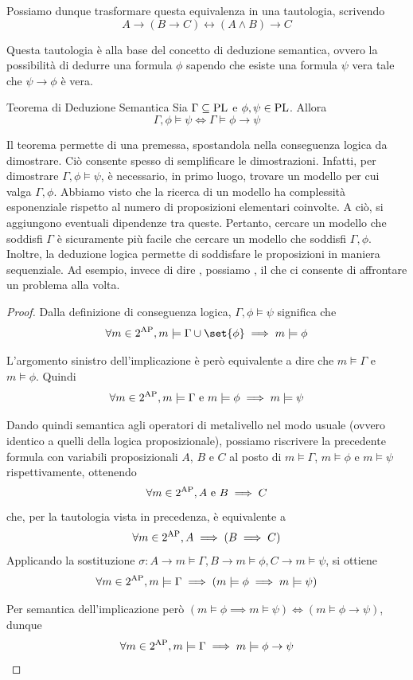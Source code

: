 Possiamo dunque trasformare questa equivalenza in una tautologia, scrivendo
\[A \to (B\to C) \leftrightarrow (A\land B)\to C\]

Questa tautologia è alla base del concetto di deduzione semantica, ovvero la possibilità di dedurre una formula \(\phi\) sapendo che esiste una formula \(\psi\) vera tale che \(\psi \to \phi\) è vera.

\begin{theorem}[namedlabel={thm:semantic_deduction}{Teorema di Deduzione Semantica}]{Teorema di Deduzione Semantica}
  Sia \(\Gamma \subseteq \operatorname{PL}\) e \(\phi,\psi \in \operatorname{PL}\). Allora
  \[\Gamma,\phi \models \psi \iff \Gamma \models \phi\to\psi\]
\end{theorem}

Il teorema permette di  una premessa, spostandola nella conseguenza logica da dimostrare.
Ciò consente spesso di semplificare le dimostrazioni. 
Infatti, per dimostrare \(\Gamma,\phi \models \psi\), è necessario, in primo luogo, trovare un modello per cui valga \(\Gamma, \phi\).
Abbiamo visto che la ricerca di un modello ha complessità esponenziale rispetto al numero di proposizioni elementari coinvolte. A ciò, si aggiungono eventuali dipendenze tra queste. 
Pertanto, cercare un modello che soddisfi \(\Gamma\) è sicuramente più facile che cercare un modello che soddisfi \(\Gamma, \phi\).
Inoltre, la deduzione logica permette di soddisfare le proposizioni in maniera sequenziale.
Ad esempio, invece di dire , possiamo , il che ci consente di affrontare un problema alla volta.

\begin{proof}
  Dalla definizione di conseguenza logica, \(\Gamma,\phi \models \psi\) significa che
  \[\forall m \in 2^{\AP}, m\models \Gamma \cup \set{\phi} \implies m\models \phi\]

  L'argomento sinistro dell'implicazione è però equivalente a dire che \(m\models \Gamma\) e \(m\models \phi\). Quindi
  \[\forall m \in 2^{\AP}, m\models \Gamma \text{ e } m\models \phi \implies m\models \psi\]

  Dando quindi semantica agli operatori di metalivello nel modo usuale (ovvero identico a quelli della logica proposizionale), possiamo riscrivere la precedente formula con variabili proposizionali \(A\), \(B\) e \(C\) al posto di \(m\models \Gamma\), \(m\models \phi\) e \(m\models \psi\) rispettivamente, ottenendo
  \[\forall m \in 2^{\AP}, A\text{ e }B \implies C\]
  che, per la tautologia vista in precedenza, è equivalente a
  \[\forall m \in 2^{\AP}, A \implies (B \implies C)\]
  Applicando la sostituzione \(\sigma: A \to m\models \Gamma, B \to m\models \phi, C \to m\models \psi\), si ottiene 
  \[\forall m \in 2^{\AP}, m\models \Gamma \implies (m\models \phi \implies m\models \psi)\]

  Per semantica dell'implicazione però \((m\models \phi \implies m\models \psi) \iff (m\models \phi \to \psi)\), dunque
  \[\forall m \in 2^{\AP}, m\models \Gamma \implies m\models \phi\to\psi\]
\end{proof}

